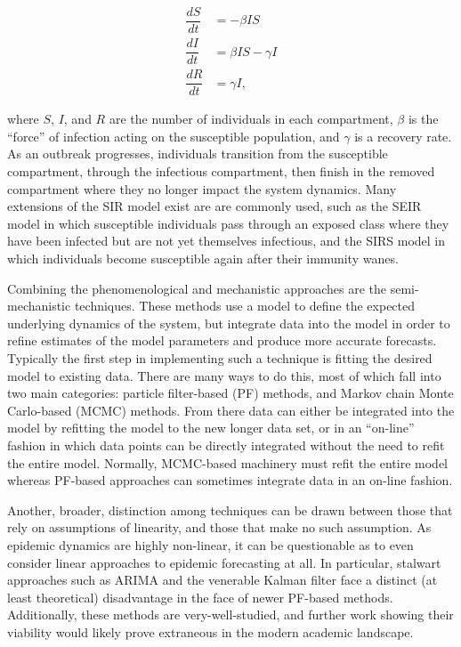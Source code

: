 \begin{equation}
    \begin{array}{rl}
        \dfrac{dS}{dt} & = - \beta I S \\
        \dfrac{dI}{dt} & = \beta I S - \gamma I  \\
        \dfrac{dR}{dt} & = \gamma I,
    \end{array}
\end{equation}

where $S$, $I$, and $R$ are the number of individuals in each compartment, $\beta$ is the ``force'' of infection acting on the susceptible population, and $\gamma$ is a recovery rate. As an outbreak progresses, individuals transition from the susceptible compartment, through the infectious compartment, then finish in the removed compartment where they no longer impact the system dynamics. Many extensions of the SIR model exist are are commonly used, such as the SEIR model in which susceptible individuals pass through an exposed class where they have been infected but are not yet themselves infectious, and the SIRS model in which individuals become susceptible again after their immunity wanes.

Combining the phenomenological and mechanistic approaches are the semi-mechanistic techniques. These methods use a model to define the expected underlying dynamics of the system, but integrate data into the model in order to refine estimates of the model parameters and produce more accurate forecasts. Typically the first step in implementing such a technique is fitting the desired model to existing data. There are many ways to do this, most of which fall into two main categories: particle filter-based (PF) methods, and Markov chain Monte Carlo-based (MCMC) methods. From there data can either be integrated into the model by refitting the model to the new longer data set, or in an ``on-line'' fashion in which data points can be directly integrated without the need to refit the entire model. Normally, MCMC-based machinery must refit the entire model whereas PF-based approaches can sometimes integrate data in an on-line fashion.

Another, broader, distinction among techniques can be drawn between those that rely on assumptions of linearity, and those that make no such assumption. As epidemic dynamics are highly non-linear, it can be questionable as to even consider linear approaches to epidemic forecasting at all. In particular, stalwart approaches such as ARIMA and the venerable Kalman filter face a distinct (at least theoretical) disadvantage in the face of newer PF-based methods. Additionally, these methods are very-well-studied, and further work showing their viability would likely prove extraneous in the modern academic landscape.


